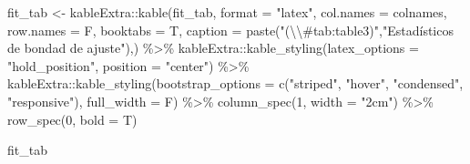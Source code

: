 \documentclass[
  12pt,
  a4paper,
]{article}
\newenvironment{Shaded}{\begin{snugshade}}{\end{snugshade}}
\newcommand{\AttributeTok}[1]{\textcolor[rgb]{0.77,0.63,0.00}{#1}}
\newcommand{\DecValTok}[1]{\textcolor[rgb]{0.00,0.00,0.81}{#1}}
\newcommand{\FunctionTok}[1]{\textcolor[rgb]{0.00,0.00,0.00}{#1}}
\newcommand{\NormalTok}[1]{#1}
\newcommand{\OtherTok}[1]{\textcolor[rgb]{0.56,0.35,0.01}{#1}}
\newcommand{\SpecialCharTok}[1]{\textcolor[rgb]{0.00,0.00,0.00}{#1}}
\newcommand{\StringTok}[1]{\textcolor[rgb]{0.31,0.60,0.02}{#1}}
\begin{document}
\begin{Shaded}
\begin{Highlighting}[]
\NormalTok{fit\_tab }\OtherTok{\textless{}{-}}\NormalTok{ kableExtra}\SpecialCharTok{::}\FunctionTok{kable}\NormalTok{(fit\_tab, }
                             \AttributeTok{format =} \StringTok{"latex"}\NormalTok{, }
                             \AttributeTok{col.names =}\NormalTok{ colnames,}
                             \AttributeTok{row.names =}\NormalTok{ F,}
                             \AttributeTok{booktabs =}\NormalTok{ T, }
                             \AttributeTok{caption =} \FunctionTok{paste}\NormalTok{(}\StringTok{"(}\SpecialCharTok{\textbackslash{}\textbackslash{}}\StringTok{\#tab:table3)"}\NormalTok{,}\StringTok{"Estadísticos de bondad de ajuste"}\NormalTok{),) }\SpecialCharTok{\%\textgreater{}\%} 
\NormalTok{  kableExtra}\SpecialCharTok{::}\FunctionTok{kable\_styling}\NormalTok{(}\AttributeTok{latex\_options =} \StringTok{"hold\_position"}\NormalTok{, }
                            \AttributeTok{position =} \StringTok{"center"}\NormalTok{) }\SpecialCharTok{\%\textgreater{}\%}
\NormalTok{  kableExtra}\SpecialCharTok{::}\FunctionTok{kable\_styling}\NormalTok{(}\AttributeTok{bootstrap\_options =} \FunctionTok{c}\NormalTok{(}\StringTok{"striped"}\NormalTok{, }\StringTok{"hover"}\NormalTok{, }\StringTok{"condensed"}\NormalTok{, }\StringTok{"responsive"}\NormalTok{), }\AttributeTok{full\_width =}\NormalTok{ F) }\SpecialCharTok{\%\textgreater{}\%} 
  \FunctionTok{column\_spec}\NormalTok{(}\DecValTok{1}\NormalTok{, }\AttributeTok{width =} \StringTok{"2cm"}\NormalTok{) }\SpecialCharTok{\%\textgreater{}\%}
  \FunctionTok{row\_spec}\NormalTok{(}\DecValTok{0}\NormalTok{, }\AttributeTok{bold =}\NormalTok{ T)}

\NormalTok{fit\_tab}
\end{Highlighting}
\end{Shaded}
\end{document}
